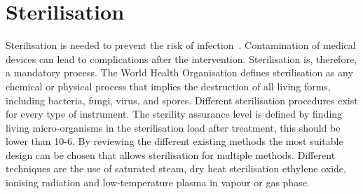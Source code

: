 \documentclass[whitelogo]{tudelft-report}
\begin{document}
{\section{Sterilisation}
Sterilisation is needed to prevent the risk of infection~\cite{tessarolo2008sterilization}. Contamination of medical devices can lead to complications after the intervention. Sterilisation is, therefore, a mandatory process. The World Health Organisation defines sterilisation as any chemical or physical process that implies the destruction of all living forms, including bacteria, fungi, virus, and spores. Different sterilisation procedures exist for every type of instrument. The sterility assurance level is defined by finding living micro-organisms in the sterilisation load after treatment, this should be lower than 10-6. By reviewing the different existing methods the most suitable design can be chosen that allows sterilisation for multiple methods. Different techniques are the use of saturated steam, dry heat sterilisation ethylene oxide, ionising radiation and low-temperature plasma in vapour or gas phase. 

}
\end{document}
